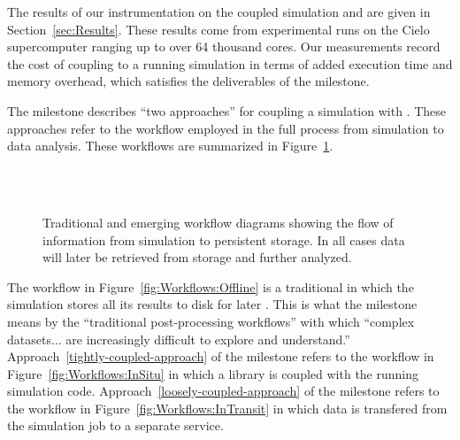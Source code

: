 The results of our instrumentation on the coupled simulation and \vda are
given in Section~\ref{sec:Results}.  These results come from experimental
runs on the Cielo supercomputer ranging up to over 64
thousand cores.  Our measurements record the cost of coupling \vda to a
running simulation in terms of added execution time and memory overhead,
which satisfies the deliverables of the milestone.

The milestone describes ``two approaches'' for coupling a simulation with
\vda.  These approaches refer to the workflow employed in the full process
from simulation to data analysis.  These workflows are summarized in
Figure~\ref{fig:Workflows}.

\begin{figure}
  \centering
   \\
   \\
  \caption[Visualization and data analysis workflows.]{Traditional and
    emerging workflow diagrams showing the flow of information from
    simulation to persistent storage.  In all cases data will later be
    retrieved from storage and further analyzed.}
  \label{fig:Workflows}
\end{figure}

The workflow in Figure~\ref{fig:Workflows:Offline} is a traditional
 in which the simulation stores all its
results to disk for later \vda.  This is what the milestone means by the
``traditional post-processing workflows'' with which ``complex
datasets... are increasingly difficult to explore and understand.''
Approach~\ref{tightly-coupled-approach} of the milestone refers to the
 workflow in Figure~\ref{fig:Workflows:InSitu} in
which a \vda library is coupled with the running simulation code.
Approach~\ref{loosely-coupled-approach} of the milestone refers to the
\keyterm{\intransit} workflow in Figure~\ref{fig:Workflows:InTransit} in
which data is transfered from the simulation job to a separate \vda
service.

